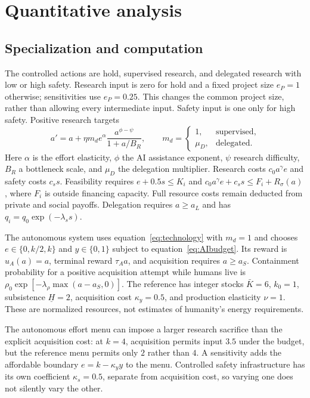 \section{Quantitative analysis}\label{sec:quant}
\subsection{Specialization and computation}
The controlled actions are hold, supervised research, and delegated research with low or high safety. Research input is zero for hold and a fixed project size $e_P=1$ otherwise; sensitivities use $e_P=0.25$. This changes the common project size, rather than allowing every intermediate input. Safety input is one only for high safety. Positive research targets
\begin{equation}\label{eq:technology}
 a'=a+\eta m_d e^\alpha\frac{a^{\phi-\psi}}{1+a/B_R},\qquad
 m_d=\begin{cases}1,&\text{supervised},\\\mu_D,&\text{delegated}.
 \end{cases}
\end{equation}
Here $\alpha$ is the effort elasticity, $\phi$ the AI assistance exponent, $\psi$ research difficulty, $B_R$ a bottleneck scale, and $\mu_D$ the delegation multiplier. Research costs $c_0a^\gamma e$ and safety costs $c_s s$. Feasibility requires $e+0.5s\leq K_i$ and $c_0a^\gamma e+c_s s\leq F_i+R_\sigma(a)$, where $F_i$ is outside financing capacity. Full resource costs remain deducted from private and social payoffs. Delegation requires $a\geq a_L$ and has $q_i=q_0\exp(-\lambda_s s)$.

The autonomous system uses equation~\eqref{eq:technology} with $m_d=1$ and chooses $e\in\{0,k/2,k\}$ and $y\in\{0,1\}$ subject to equation~\eqref{eq:AIbudget}. Its reward is $u_A(a)=a$, terminal reward $\tau_Aa$, and acquisition requires $a\geq a_S$. Containment probability for a positive acquisition attempt while humans live is $\rho_0\exp[-\lambda_\rho\max(a-a_S,0)]$. The reference has integer stocks $\bar K=6$, $k_0=1$, subsistence $\underline H=2$, acquisition cost $\kappa_y=0.5$, and production elasticity $\nu=1$. These are normalized resources, not estimates of humanity's energy requirements.

The autonomous effort menu can impose a larger research sacrifice than the explicit acquisition cost: at $k=4$, acquisition permits input $3.5$ under the budget, but the reference menu permits only $2$ rather than $4$. A sensitivity adds the affordable boundary $e=k-\kappa_y y$ to the menu. Controlled safety infrastructure has its own coefficient $\kappa_s=0.5$, separate from acquisition cost, so varying one does not silently vary the other.

